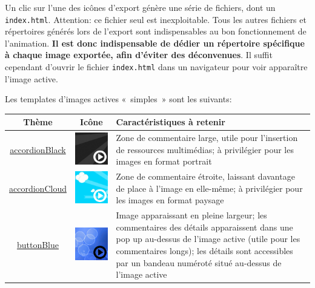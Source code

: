 {Un clic sur l'une des icônes d'export génère une série de fichiers, dont un \verb|index.html|. 
Attention: ce fichier seul est inexploitable. Tous les autres fichiers et répertoires générés lors de l'export 
sont indispensables au bon fonctionnement de l'animation. \textbf{Il est donc indispensable de dédier un répertoire 
spécifique à chaque image exportée, afin d'éviter des déconvenues}.
Il suffit cependant d'ouvrir le fichier \verb|index.html| dans un navigateur pour voir apparaître l'image active.

Les templates d'images actives «~simples~» sont les suivants:
\begin{center}
\begin{tabular}{|c|c|p{3in}|}
\hline
Thème & Icône & Caractéristiques à retenir\\
\hline
\href{http://geoffrey-gekiere.ac-versailles.fr/xia1/accordionBlack}{accordionBlack}  & \includegraphics[scale=0.5]{./images/accordionBlack} & Zone de commentaire large, utile pour l'insertion de ressources multimédias; à privilégier pour les images en format portrait\\
\hline
\href{http://geoffrey-gekiere.ac-versailles.fr/xia1/accordionCloud}{accordionCloud} &  \includegraphics[scale=0.5]{./images/accordionCloud}& Zone de commentaire étroite, laissant davantage de place à l'image en elle-même; à privilégier pour les images en format paysage\\
\hline
\href{http://geoffrey-gekiere.ac-versailles.fr/xia1/buttonBlue}{buttonBlue}&  \includegraphics[scale=0.5]{./images/buttonBlue} & Image apparaissant en pleine largeur; les commentaires des détails apparaissent dans une pop up au-dessus de l'image active (utile pour les commentaires longs); les détails sont accessibles par un bandeau numéroté situé au-dessus de l'image active\\

\end{tabular}
\end{center}}
